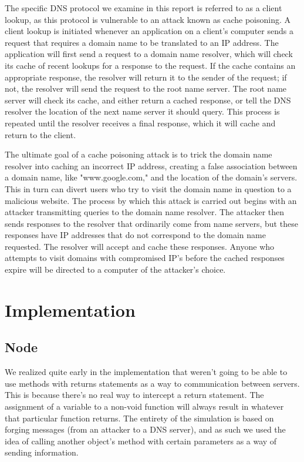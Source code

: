 \documentclass[a4paper, 12pt]{article} %
\begin{document}
The specific DNS protocol we examine in this report is referred to as a client lookup, as this protocol is vulnerable to an attack known as cache poisoning\cite{Son}. A client lookup is initiated whenever an application on a client's computer sends a request that requires a domain name to be translated to an IP address. The application will first send a request to a domain name resolver, which will check its cache of recent lookups for a response to the request. If the cache contains an appropriate response, the resolver will return it to the sender of the request; if not, the resolver will send the request to the root name server. The root name server will check its cache, and either return a cached response, or tell the DNS resolver the location of the next name server it should query\cite{Son}. This process is repeated until the resolver receives a final response, which it will cache and return to the client.

The ultimate goal of a cache poisoning attack is to trick the domain name resolver into caching an incorrect IP address, creating a false association between a domain name, like "www.google.com," and the location of the domain's servers. This in turn can divert users who try to visit the domain name in question to a malicious website. The process by which this attack is carried out begins with an attacker transmitting queries to the domain name resolver. The attacker then sends responses to the resolver that ordinarily come from name servers, but these responses have IP addresses that do not correspond to the domain name requested. The resolver will accept and cache these responses. Anyone who attempts to visit domains with compromised IP's before the cached responses expire will be directed to a computer of the attacker's choice. 



\section*{Implementation}

\subsection*{Node}

We realized quite early in the implementation that weren't going to be able to use methods with returns statements as a way to communication between servers. This is because there's no real way to intercept a return statement. The assignment of a variable to a non-void function will always result in whatever that particular function returns. The entirety of the simulation is based on forging messages (from an attacker to a DNS server), and as such we used the idea of calling another object's method with certain parameters as a way of sending information. 
\end{document}
